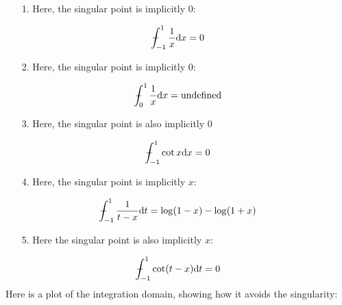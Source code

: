 \documentclass[12pt,a4paper]{article}
\def\D{ {\rm d} }
\def\Xint#1{ \mathchoice
   {\XXint\displaystyle\textstyle{#1} }%
   {\XXint\textstyle\scriptstyle{#1} }%
   {\XXint\scriptstyle\scriptscriptstyle{#1} }%
   {\XXint\scriptscriptstyle\scriptscriptstyle{#1} }%
   \!\int}
\def\XXint#1#2#3{ {\setbox0=\hbox{$#1{#2#3}{\int}$}
     \vcenter{\hbox{$#2#3$}}\kern-.5\wd0} }
\def\dashint{\Xint-}
\def\dx{\D x}
\def\dt{\D t}
\begin{document}
\begin{itemize}
\item[1. ] Here, the singular point is implicitly 0:

\end{itemize}
\[
\dashint_{-1}^1  {1 \over x} \dx = 0
\]
\begin{itemize}
\item[2. ] Here, the singular point is implicitly 0:

\end{itemize}
\[
\dashint_0^1  {1 \over x} \dx = \hbox{undefined}
\]
\begin{itemize}
\item[3. ] Here, the singular point is also implicitly 0

\end{itemize}
\[
\dashint_{-1}^1  \cot x \dx = 0
\]
\begin{itemize}
\item[4. ] Here, the singular point is implicitly $x$:

\end{itemize}
\[
\dashint_{-1}^1  {1 \over t - x} \D t = \log(1-x) - \log(1+x)
\]
\begin{itemize}
\item[5. ] Here the singular point is also implicitly $x$:

\end{itemize}
\[
\dashint_{-1}^1  \cot(t-x) \dt = 0
\]
Here is a plot of the integration domain, showing how it avoids the singularity:
\end{document}
